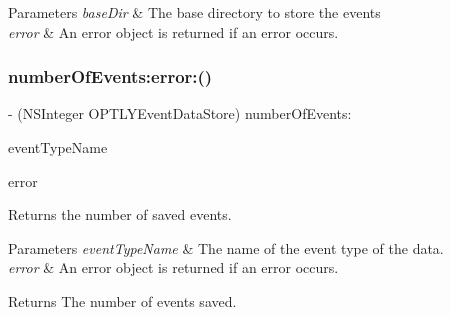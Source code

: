 \begin{DoxyParams}{Parameters}
{\em base\+Dir} & The base directory to store the events \\
\hline
{\em error} & An error object is returned if an error occurs. \\
\hline
\end{DoxyParams}
\mbox{\label{protocol_o_p_t_l_y_event_data_store_01-p_a59aa5d4995f2d9bcaca525c9001043f4}} 
\subsubsection{\texorpdfstring{number\+Of\+Events\+:error\+:()}{numberOfEvents:error:()}}
{\footnotesize\ttfamily -\/ (N\+S\+Integer O\+P\+T\+L\+Y\+Event\+Data\+Store) number\+Of\+Events\+: \begin{DoxyParamCaption}\item[{(nonnull N\+S\+String $\ast$)}]{event\+Type\+Name }\item[{error:(N\+S\+Error $\ast$\+\_\+\+Nullable \+\_\+\+\_\+autoreleasing $\ast$\+\_\+\+Nullable)}]{error }\end{DoxyParamCaption}}

Returns the number of saved events.


\begin{DoxyParams}{Parameters}
{\em event\+Type\+Name} & The name of the event type of the data. \\
\hline
{\em error} & An error object is returned if an error occurs. \\
\hline
\end{DoxyParams}
\begin{DoxyReturn}{Returns}
The number of events saved. 
\end{DoxyReturn}
\mbox{\label{protocol_o_p_t_l_y_event_data_store_01-p_ad94b56bc2e37603df7e868f11b38a9b8}} 
